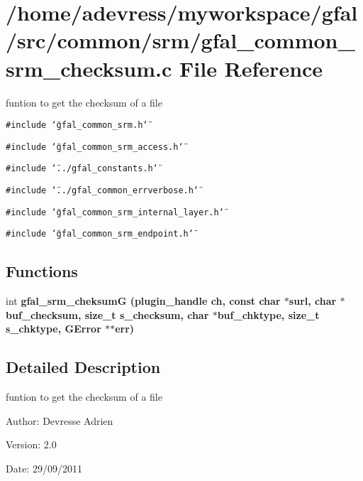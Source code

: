 \section{/home/adevress/myworkspace/gfal/src/common/srm/gfal\_\-common\_\-srm\_\-checksum.c File Reference}
\label{gfal__common__srm__checksum_8c}
funtion to get the checksum of a file 

{\tt \#include \char`\"{}gfal\_\-common\_\-srm.h\char`\"{}}\par
{\tt \#include \char`\"{}gfal\_\-common\_\-srm\_\-access.h\char`\"{}}\par
{\tt \#include \char`\"{}../gfal\_\-constants.h\char`\"{}}\par
{\tt \#include \char`\"{}../gfal\_\-common\_\-errverbose.h\char`\"{}}\par
{\tt \#include \char`\"{}gfal\_\-common\_\-srm\_\-internal\_\-layer.h\char`\"{}}\par
{\tt \#include \char`\"{}gfal\_\-common\_\-srm\_\-endpoint.h\char`\"{}}\par
\subsection*{Functions}
\begin{CompactItemize}
\item 
int \bf{gfal\_\-srm\_\-cheksum\-G} (plugin\_\-handle ch, const char $\ast$surl, char $\ast$buf\_\-checksum, size\_\-t s\_\-checksum, char $\ast$buf\_\-chktype, size\_\-t s\_\-chktype, GError $\ast$$\ast$err)
\end{CompactItemize}


\subsection{Detailed Description}
funtion to get the checksum of a file 

\begin{Desc}
\item[Author:]Devresse Adrien \end{Desc}
\begin{Desc}
\item[Version:]2.0 \end{Desc}
\begin{Desc}
\item[Date:]29/09/2011 \end{Desc}


